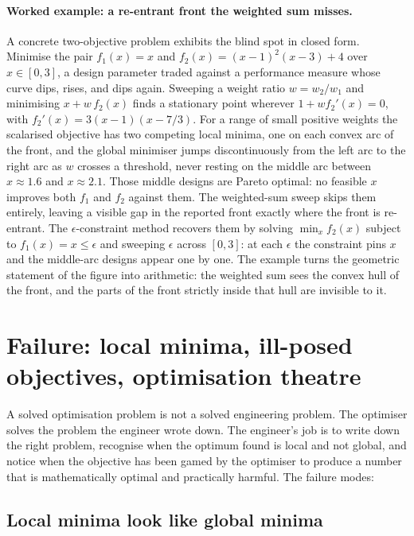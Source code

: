 \paragraph{Worked example: a re-entrant front the weighted sum
misses.}
A concrete two-objective problem exhibits the blind spot in closed
form. Minimise the pair $f_{1}(x) = x$ and $f_{2}(x) = (x - 1)^{2}(x -
3) + 4$ over $x \in [0, 3]$, a design parameter traded against a
performance measure whose curve dips, rises, and dips again. Sweeping
a weight ratio $w = w_{2}/w_{1}$ and minimising $x + w \, f_{2}(x)$
finds a stationary point wherever $1 + w f_{2}'(x) = 0$, with
$f_{2}'(x) = 3(x - 1)(x - 7/3)$. For a range of small positive weights
the scalarised objective has two competing local minima, one on each
convex arc of the front, and the global minimiser jumps discontinuously
from the left arc to the right arc as $w$ crosses a threshold, never
resting on the middle arc between $x \approx 1.6$ and $x \approx 2.1$.
Those middle designs are Pareto optimal: no feasible $x$ improves both
$f_{1}$ and $f_{2}$ against them. The weighted-sum sweep skips them
entirely, leaving a visible gap in the reported front exactly where the
front is re-entrant. The $\epsilon$-constraint method recovers them by
solving $\min_{x} f_{2}(x)$ subject to $f_{1}(x) = x \leq \epsilon$ and
sweeping $\epsilon$ across $[0, 3]$: at each $\epsilon$ the constraint
pins $x$ and the middle-arc designs appear one by one. The example
turns the geometric statement of the figure into arithmetic: the
weighted sum sees the convex hull of the front, and the parts of the
front strictly inside that hull are invisible to it.

\section{Failure: local minima, ill-posed objectives, optimisation
theatre}

A solved optimisation problem is not a solved engineering problem.
The optimiser solves the problem the engineer wrote down. The
engineer's job is to write down the right problem, recognise when
the optimum found is local and not global, and notice when the
objective has been gamed by the optimiser to produce a number
that is mathematically optimal and practically harmful. The
failure modes:

\subsection{Local minima look like global minima}

